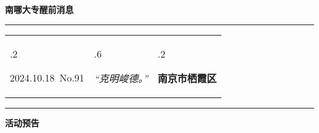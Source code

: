 \documentclass[letterpaper, 12pt]{article}
\begin{document}
\begin{center}
    \Huge\textbf{南哪大专醒前消息}
\end{center}
\vspace{4mm}
\hrule
\renewcommand\tabularxcolumn[1]{m{#1}}
\begin{tabularx}{\textwidth}{>{\hsize.2\hsize}X>{\hsize.6\hsize}X>{\hsize.2\hsize}X}
    \begin{flushleft}
        2024.10.18\, No.91
    \end{flushleft}
    &
    \begin{center}
        \textit{“克明峻德。”}
    \end{center}
    &
    \begin{flushright}
        \textbf{南京市栖霞区}
    \end{flushright}
\end{tabularx}
\vspace{-3.5mm}
\hrule
\vspace{4mm}
\centerline{\huge\textbf{活动预告}}
\end{document}
